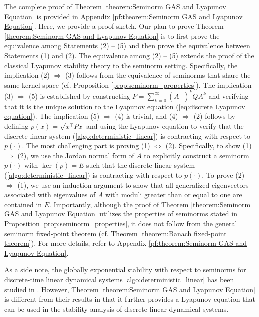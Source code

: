 \documentclass[11 pt]{article}
\begin{document}
	
	
	
	
	
	
	The complete proof of Theorem \ref{theorem:Seminorm GAS and Lyapunov Equation} is provided in Appendix \ref{pf:theorem:Seminorm GAS and Lyapunov Equation}. Here, we provide a proof sketch. Our plan to prove Theorem \ref{theorem:Seminorm GAS and Lyapunov Equation} is to first prove the equivalence among Statements (2) -- (5) and then prove the equivalence between Statements (1) and (2). The equivalence among (2) -- (5) extends the proof of the classical Lyapunov stability theory to the seminorm setting. Specifically, the implication (2) $\Rightarrow$ (3) follows from the equivalence of seminorms that share the same kernel space (cf. Proposition \ref{prop:seminorm_properties}). The implication (3) $\Rightarrow$ (5) is established by constructing $P = \sum_{k=0}^\infty (A^\top)^k Q A^k$ and verifying that it is the unique solution to the Lyapunov equation (\ref{eq:discrete Lyapunov equation}). The implication (5) $\Rightarrow$ (4) is trivial, and (4) $\Rightarrow$ (2) follows by defining $p(x) = \sqrt{x^\top P x}$ and using the Lyapunov equation to verify that the discrete linear system (\ref{algo:deterministic_linear}) is contracting with respect to $p(\cdot)$. The most challenging part is proving (1) $\Leftrightarrow$ (2). Specifically, to show (1) $\Rightarrow$ (2), we use the Jordan normal form of $A$ to explicitly construct a seminorm $p(\cdot)$ with $\ker(p) = E$ such that the discrete linear system (\ref{algo:deterministic_linear}) is contracting with respect to $p(\cdot)$. To prove (2) $\Rightarrow$ (1), we use an induction argument to show that all generalized eigenvectors associated with eigenvalues of $A$ with moduli greater than or equal to one are contained in $E$. Importantly, although the proof of Theorem \ref{theorem:Seminorm GAS and Lyapunov Equation} utilizes the properties of seminorms stated in Proposition \ref{prop:seminorm_properties}, it does not follow from the general seminorm fixed-point theorem (cf. Theorem \ref{theorem:Banach fixed-point theorem}). For more details, refer to Appendix \ref{pf:theorem:Seminorm GAS and Lyapunov Equation}. 
	
	As a side note, the globally exponential stability with respect to seminorms for discrete-time linear dynamical systems \eqref{algo:deterministic_linear} has been studied in \cite[Lemma 28]{Bullo2023}. However, Theorem \ref{theorem:Seminorm GAS and Lyapunov Equation} is different from their results in that it further provides a Lyapunov equation that can be used in the stability analysis of discrete linear dynamical systems. 
	
\end{document}
